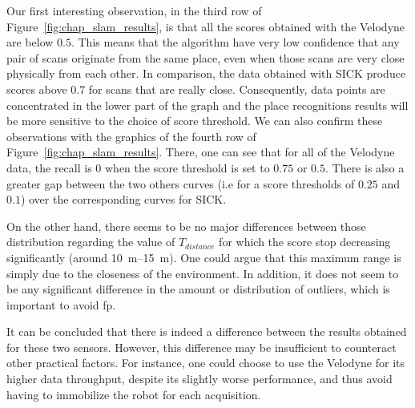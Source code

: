 Our first interesting observation, in the third row of Figure~\ref{fig:chap_slam_results}, is that all the scores obtained with the Velodyne are below $0.5$. This means that the algorithm have very low confidence that any pair of scans originate from the same place, even when those scans are very close physically from each other. In comparison, the data obtained with SICK produce scores above 0.7 for scans that are really close. Consequently, data points are concentrated in the lower part of the graph and the place recognitions results will be more sensitive to the choice of score threshold. We can also confirm these observations with the graphics of the fourth row of Figure~\ref{fig:chap_slam_results}. There, one can see that for all of the Velodyne data, the recall is 0 when the score threshold is set to $0.75$ or $0.5$. There is also a greater gap between the two others curves (i.e for a score thresholds of $0.25$ and $0.1$) over the corresponding curves for SICK.

On the other hand, there seems to be no major differences between those distribution regarding the value of $T_{distance}$ for which the score stop decreasing significantly (around \SIrange{10}{15}{\meter}). One could argue that this maximum range is simply due to the closeness of the environment. In addition, it does not seem to be any significant difference in the amount or distribution of outliers, which is important to avoid \gls*{fp}.

It can be concluded that there is indeed a difference between the results obtained for these two sensors. However, this difference may be insufficient to counteract other practical factors. For instance, one could choose to use the Velodyne for its higher data throughput, despite its slightly worse performance, and thus avoid having to immobilize the robot for each acquisition.

